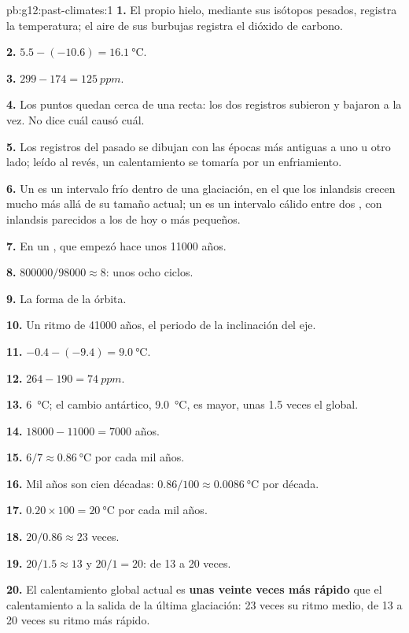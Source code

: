 \begin{solution}{pb:g12:past-climates:1}
\textbf{1.} El propio hielo, mediante sus isótopos pesados, registra la
temperatura; el aire de sus burbujas registra el dióxido de carbono.

\textbf{2.} $5.5 - (-10.6) = \qty{16.1}{\degreeCelsius}$.

\textbf{3.} $299 - 174 = \qty{125}{ppm}$.

\textbf{4.} Los puntos quedan cerca de una recta: los dos registros subieron
y bajaron a la vez. No dice cuál causó cuál.

\textbf{5.} Los registros del pasado se dibujan con las épocas más antiguas a uno u otro
lado; leído al revés, un calentamiento se tomaría por un enfriamiento.

\textbf{6.} Un  es un intervalo frío dentro de una glaciación, en el que los
inlandsis crecen mucho más allá de su tamaño actual; un  es un intervalo
cálido entre dos , con inlandsis parecidos a los de hoy o
más pequeños.

\textbf{7.} En un , que empezó hace unos \num{11000} años.

\textbf{8.} $\num{800000}/\num{98000} \approx 8$: unos ocho ciclos.

\textbf{9.} La forma de la órbita.

\textbf{10.} Un ritmo de \num{41000} años, el periodo de la inclinación del
eje.

\textbf{11.} $-0.4 - (-9.4) = \qty{9.0}{\degreeCelsius}$.

\textbf{12.} $264 - 190 = \qty{74}{ppm}$.

\textbf{13.} \qty{6}{\degreeCelsius}; el cambio antártico, \qty{9.0}{\degreeCelsius},
es mayor, unas 1.5 veces el global.

\textbf{14.} $\num{18000} - \num{11000} = \num{7000}$ años.

\textbf{15.} $6/7 \approx \qty{0.86}{\degreeCelsius}$ por cada mil años.

\textbf{16.} Mil años son cien décadas: $0.86/100 \approx
\qty{0.0086}{\degreeCelsius}$ por década.

\textbf{17.} $0.20 \times 100 = \qty{20}{\degreeCelsius}$ por cada mil años.

\textbf{18.} $20/0.86 \approx 23$ veces.

\textbf{19.} $20/1.5 \approx 13$ y $20/1 = 20$: de 13 a 20 veces.

\textbf{20.} El calentamiento global actual es \textbf{unas veinte veces más rápido} que
el calentamiento a la salida de la última glaciación: 23 veces su ritmo medio, de 13 a 20 veces
su ritmo más rápido.
\end{solution}

